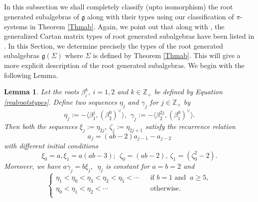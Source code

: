 \documentclass[12pt,reqno]{amsart}
\theoremstyle{plain}
\newtheorem{lem}{Lemma}
\theoremstyle{definition}
\theoremstyle{remark}
\newcommand{\lie}[1]{\mathfrak{#1}}
\newcommand\bz{\mathbb Z}
\begin{document}
\hrulefill\vspace{10pt}
\fi

\subsection{} In this subsection we shall completely classify (upto isomorphism) the root generated subalgebras of $\lie g$ along with their types using our classification of $\pi$-systems in Theorem \ref{Thmab}. Again, we point out that along with \cite[Theorem 1]{habib2023root}, the generalized Cartan matrix types of root generated subalgebras have been listed in \cite[Table 2]{carbone2021commutator}. In this Section, we determine precisely the types of the root generated subalgebras $\lie g(\Sigma)$ where $\Sigma$ is defined by Theorem \ref{Thmab}. This will give a more explicit description of the root generated subalgebras.
We begin with the following Lemma.
\begin{lem}\label{lem1noncongruent}
    Let the roots $\beta_{i}^{k},\ i=1,2$ and $k\in \bz_+$ be defined by Equation \ref{realrootstypes}. Define two sequences $\eta_j$ and $\gamma_j$ for $j\in\bz_+$ by
    $$\eta_j:=-\langle \beta_1^j,(\beta_2^0)^\vee
    \rangle,\ \ \gamma_j:=-\langle \beta_2^{2j},(\beta_1^0)^\vee
    \rangle.$$
    Then both the sequences $\xi_j:=\eta_{2j},\ \zeta_{j}:=\eta_{2j+1}$ satisfy the recurrence relation $$a_j=(ab-2)a_{j-1}-a_{j-2}$$ with different initial conditions
    $$\xi_0=a,\xi_1=a(ab-3);\ \ \zeta_0=(ab-2),\ \zeta_1= (\zeta_0^2-2).$$ Moreover, we have $a\gamma_j=b\xi_j,$\ $\eta_j$ is constant for $a=b=2$ and 
    $$\begin{cases}
        \eta_1<\eta_0<\eta_3<\eta_2<\eta_5<\cdots\ \ & \text{ if } b=1\text{ and }\ a\geq 5,\\
        \eta_0<\eta_1<\eta_2<\cdots \ \ &\text{ otherwise}.\\
    \end{cases}$$
\end{lem}
\end{document}
